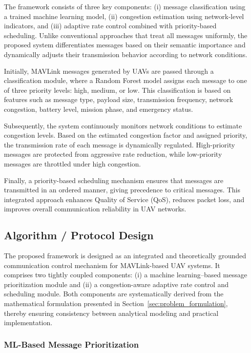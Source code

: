\documentclass[pdflatex,sn-mathphys-num]{sn-jnl}%
\theoremstyle{thmstyleone}%
\theoremstyle{thmstyletwo}%
\theoremstyle{thmstylethree}%
\begin{document}
The framework consists of three key components: (i) message classification using a trained machine learning model, (ii) congestion estimation using network-level indicators, and (iii) adaptive rate control combined with priority-based scheduling. Unlike conventional approaches that treat all messages uniformly, the proposed system differentiates messages based on their semantic importance and dynamically adjusts their transmission behavior according to network conditions.

Initially, MAVLink messages generated by UAVs are passed through a classification module, where a Random Forest model assigns each message to one of three priority levels: high, medium, or low. This classification is based on features such as message type, payload size, transmission frequency, network congestion, battery level, mission phase, and emergency status.

Subsequently, the system continuously monitors network conditions to estimate congestion levels. Based on the estimated congestion factor and assigned priority, the transmission rate of each message is dynamically regulated. High-priority messages are protected from aggressive rate reduction, while low-priority messages are throttled under high congestion.

Finally, a priority-based scheduling mechanism ensures that messages are transmitted in an ordered manner, giving precedence to critical messages. This integrated approach enhances Quality of Service (QoS), reduces packet loss, and improves overall communication reliability in UAV networks.

\subsection{ Algorithm / Protocol Design }

The proposed framework is designed as an integrated and theoretically grounded communication control mechanism for MAVLink-based UAV systems. It comprises two tightly coupled components: (i) a machine learning–based message prioritization module and (ii) a congestion-aware adaptive rate control and scheduling module. Both components are systematically derived from the mathematical formulation presented in Section~\ref{sec:problem_formulation}, thereby ensuring consistency between analytical modeling and practical implementation.

\subsubsection{ ML-Based Message Prioritization }
\end{document}
